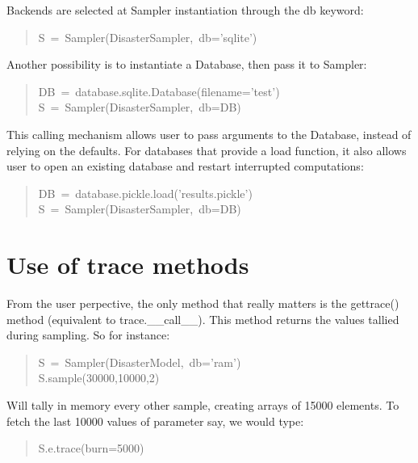 Backends are selected at Sampler instantiation through the db keyword:
\begin{quote}{\ttfamily \raggedright \noindent
S~=~Sampler(DisasterSampler,~db='sqlite')
}\end{quote}

Another possibility is to instantiate a Database, then pass it to Sampler:
\begin{quote}{\ttfamily \raggedright \noindent
DB~=~database.sqlite.Database(filename='test')~\\
S~=~Sampler(DisasterSampler,~db=DB)
}\end{quote}

This calling mechanism allows user to pass arguments to the Database, instead
of relying on the defaults. For databases that provide a load function, it also
allows user to open an existing database and restart interrupted computations:
\begin{quote}{\ttfamily \raggedright \noindent
DB~=~database.pickle.load('results.pickle')~\\
S~=~Sampler(DisasterSampler,~db=DB)
}\end{quote}



\hypertarget{use-of-trace-methods}{}
\section*{Use of trace methods}

From the user perpective, the only method that really matters is the gettrace()
method (equivalent to trace.{\_}{\_}call{\_}{\_}). This method returns the values tallied during sampling. So for
instance:
\begin{quote}{\ttfamily \raggedright \noindent
S~=~Sampler(DisasterModel,~db='ram')~\\
S.sample(30000,10000,2)
}\end{quote}

Will tally in memory every other sample, creating arrays of 15000 elements. To
fetch the last 10000 values of parameter  say, we would type:
\begin{quote}{\ttfamily \raggedright \noindent
S.e.trace(burn=5000)
}\end{quote}



